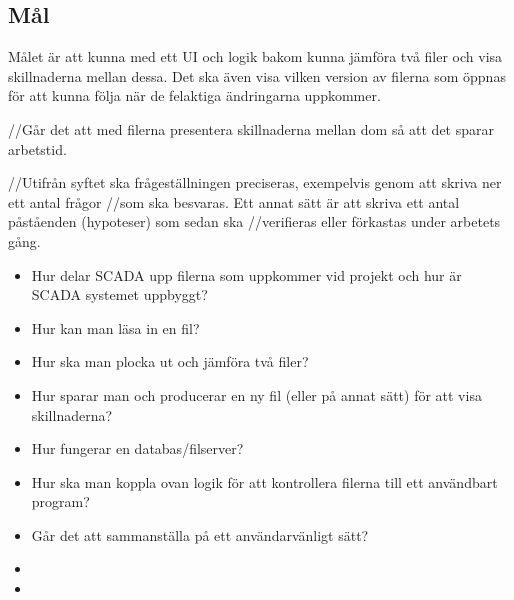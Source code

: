 \subsection{Mål}
Målet är att kunna med ett UI och logik bakom kunna jämföra två filer och visa skillnaderna mellan dessa. Det ska även visa vilken version av filerna som öppnas för att kunna följa när de felaktiga ändringarna uppkommer.



//Går det att med filerna presentera skillnaderna mellan dom så att det sparar arbetstid.


//Utifrån syftet ska frågeställningen preciseras, exempelvis genom att skriva ner ett antal frågor //som ska besvaras. Ett annat sätt är att skriva ett antal påståenden (hypoteser) som sedan ska //verifieras eller förkastas under arbetets gång.



\begin{itemize}
    \item Hur delar SCADA upp filerna som uppkommer vid projekt och hur är SCADA systemet uppbyggt?
    \item Hur kan man läsa in en fil?
    \item Hur ska man plocka ut och jämföra två filer?
    \item Hur sparar man och producerar en ny fil (eller på annat sätt) för att visa skillnaderna?
    \item Hur fungerar en databas/filserver?
    \item Hur ska man koppla ovan logik för att kontrollera filerna till ett användbart program?
    \item Går det att sammanställa på ett användarvänligt sätt?
    \item 
    \item 
\end{itemize}


